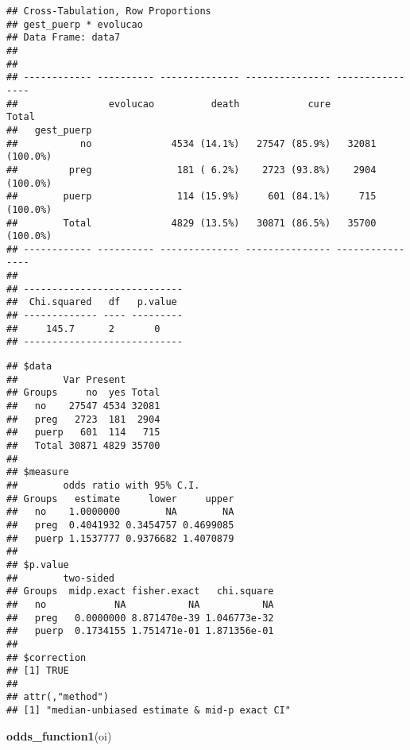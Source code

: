 \documentclass[
]{article}
\newenvironment{Shaded}{\begin{snugshade}}{\end{snugshade}}
\newcommand{\KeywordTok}[1]{\textcolor[rgb]{0.13,0.29,0.53}{\textbf{#1}}}
\newcommand{\NormalTok}[1]{#1}
\newcommand{\OperatorTok}[1]{\textcolor[rgb]{0.81,0.36,0.00}{\textbf{#1}}}
\newcommand{\StringTok}[1]{\textcolor[rgb]{0.31,0.60,0.02}{#1}}
\begin{document}
\begin{verbatim}
## Cross-Tabulation, Row Proportions  
## gest_puerp * evolucao  
## Data Frame: data7  
## 
## 
## ------------ ---------- -------------- --------------- ----------------
##                evolucao          death            cure            Total
##   gest_puerp                                                           
##           no              4534 (14.1%)   27547 (85.9%)   32081 (100.0%)
##         preg               181 ( 6.2%)    2723 (93.8%)    2904 (100.0%)
##        puerp               114 (15.9%)     601 (84.1%)     715 (100.0%)
##        Total              4829 (13.5%)   30871 (86.5%)   35700 (100.0%)
## ------------ ---------- -------------- --------------- ----------------
## 
## ----------------------------
##  Chi.squared   df   p.value 
## ------------- ---- ---------
##     145.7      2       0    
## ----------------------------
\end{verbatim}

\begin{Shaded}
\end{Shaded}

\begin{verbatim}
## $data
##        Var Present
## Groups     no  yes Total
##   no    27547 4534 32081
##   preg   2723  181  2904
##   puerp   601  114   715
##   Total 30871 4829 35700
## 
## $measure
##        odds ratio with 95% C.I.
## Groups   estimate     lower     upper
##   no    1.0000000        NA        NA
##   preg  0.4041932 0.3454757 0.4699085
##   puerp 1.1537777 0.9376682 1.4070879
## 
## $p.value
##        two-sided
## Groups  midp.exact fisher.exact   chi.square
##   no            NA           NA           NA
##   preg   0.0000000 8.871470e-39 1.046773e-32
##   puerp  0.1734155 1.751471e-01 1.871356e-01
## 
## $correction
## [1] TRUE
## 
## attr(,"method")
## [1] "median-unbiased estimate & mid-p exact CI"
\end{verbatim}

\begin{Shaded}
\begin{Highlighting}[]
\KeywordTok{odds_function1}\NormalTok{(oi)}
\end{Highlighting}
\end{Shaded}
\end{document}

